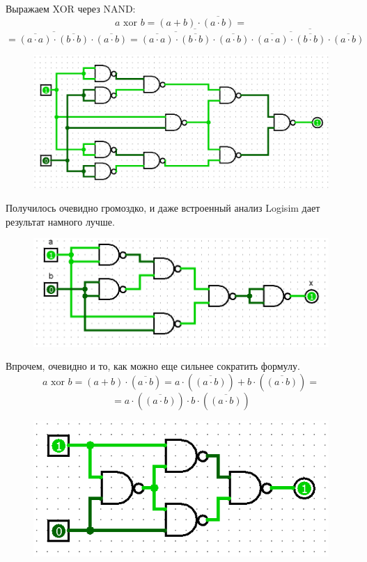 \begin{itemize}
\[\]
Выражаем XOR через NAND:
\[
a \text{ xor } b = (a + b) \cdot \overline{(a \cdot b)} = 
\]
\[
= \overline{\overline{(a \cdot a)} \cdot \overline{(b \cdot b)}} \cdot \overline{(a \cdot b)} =  \overline{\overline{\overline{(a \cdot a)} \cdot \overline{(b \cdot b)}} \cdot \overline{(a \cdot b)}} \cdot  \overline{\overline{\overline{(a \cdot a)} \cdot \overline{(b \cdot b)}} \cdot \overline{(a \cdot b)}}
\]
\begin{figure}[H]
    \centering
    \includegraphics[width=1\linewidth]{Contrexamples/XOR3.png}
\end{figure}
Получилось очевидно громоздко, и даже встроенный анализ Logisim дает результат намного лучше.
\begin{figure}[H]
    \centering
    \includegraphics[width=0.75\linewidth]{Contrexamples/XOR4.png}
\end{figure}
Впрочем, очевидно и то, как можно еще сильнее сократить формулу.
\[
a \text{ xor } b = (a + b) \cdot (\overline{a \cdot b}) = a \cdot (\overline{(a \cdot b)}) + b \cdot (\overline{(a \cdot b)}) =
\]
\[
= a \cdot (\overline{(a \cdot b)}) \cdot b \cdot (\overline{(a \cdot b)})
\]
\begin{figure}[H]
    \centering
    \includegraphics[width=0.5\linewidth]{Contrexamples/XOR5.png}

\end{figure}
\end{itemize}
